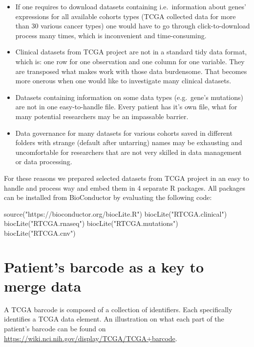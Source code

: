 \begin{itemize}
\itemsep1pt\parskip0pt
\item
  If one requires to download datasets containing i.e.~information about
  genes' expressions for all available cohorts types (TCGA collected
  data for more than 30 various cancer types) one would have to go
  through click-to-download process many times, which is inconvenient
  and time-consuming.
\item
  Clinical datasets from TCGA project are not in a standard tidy data
  format, which is: one row for one observation and one column for one
  variable. They are transposed what makes work with those data
  burdensome. That becomes more onerous when one would like to
  investigate many clinical datasets.
\item
  Datasets containing information on some data types (e.g.~gene's
  mutations) are not in one easy-to-handle file. Every patient has it's
  own file, what for many potential researchers may be an impassable
  barrier.
\item
  Data governance for many datasets for various cohorts saved in
  different folders with strange (default after untarring) names may be
  exhausting and uncomfortable for researchers that are not very skilled
  in data management or data processing.
\end{itemize}

For these reasons we prepared selected datasets from TCGA project in an
easy to handle and process way and embed them in 4 separate R packages.
All packages can be installed from BioConductor by evaluating the
following code:

\begin{Schunk}
\begin{Sinput}
source("https://bioconductor.org/biocLite.R")
biocLite("RTCGA.clinical") 
biocLite("RTCGA.rnaseq") 
biocLite("RTCGA.mutations") 
biocLite("RTCGA.cnv") 
\end{Sinput}
\end{Schunk}

\section{Patient's barcode as a key to merge
data}\label{patients-barcode-as-a-key-to-merge-data}

A TCGA barcode is composed of a collection of identifiers. Each
specifically identifies a TCGA data element. An illustration on what
each part of the patient's barcode can be found on \newline ~
\href{https://wiki.nci.nih.gov/display/TCGA/TCGA+barcode}{\url{https://wiki.nci.nih.gov/display/TCGA/TCGA+barcode}}.


